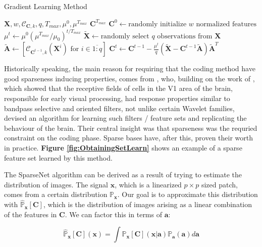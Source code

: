 \documentclass[12pt,a4paper,oneside,english]{UPBThesis}
\newcommand{\hctimes}[2]{{#1}\!\times\!{#2}}
\newcommand{\hcrange}[2]{\overline{{#1}\colon\!\!{#2}}}
\begin{document}
\begin{algorithm}
\caption{Gradient Learning Method}
\label{algo:GradSt}
\begin{algorithmic}
\Require $\textbf{X},w,\mathcal{C}_{\textbf{C},k},q,T_{max},\mu^0,\mu^{T_{max}}$
\Ensure $\textbf{C}^{T_{max}}$
\State $\textbf{C}^0 \gets \mbox{randomly initialize $w$ normalized features}$
\For {$t = \hcrange{1}{T_{max}}$}
\State $\mu^t \gets \mu^0(\mu^{T_{max}} / \mu_0)^{t / T_{max}}$ 
\State $\tilde{\textbf{X}} \gets \mbox{randomly select $q$ observations from $\textbf{X}$}$
\State $\tilde{\textbf{A}} \gets \left[ \mathcal{C}_{\textbf{C}^{t-1},k}(\textbf{X}^i) \mbox{~for $i \in \hcrange{1}{q}$} \right]$
\State $\textbf{C}^t \gets \textbf{C}^{t-1} - \frac{\mu^t}{q} \left( \tilde{\textbf{X}} - \textbf{C}^{t-1}\tilde{\textbf{A}} \right) \tilde{\textbf{A}}^T$
\EndFor
\end{algorithmic}
\end{algorithm}

Historically speaking, the main reason for requiring that the coding method have good sparseness inducing properties, comes from \cite{emergence-sparse-coding,sparse-coding-strategy-V1}, who, building on the work of \cite{macaque-cortex}, which showed that the receptive fields of cells in the V1 area of the brain, responsible for early visual processing, had response properties similar to bandpass selective and oriented filters, not unlike certain Wavelet families, devised an algorithm for learning such filters / feature sets and replicating the behaviour of the brain. Their central insight was that sparseness was the requried constraint on the coding phase. Sparse bases have, after this, proven their worth in practice. \textbf{Figure \ref{fig:ObtainingSetLearn}} shows an example of a sparse feature set learned by this method.

The SparseNet algorithm can be derived as a result of trying to estimate the distribution of images. The signal $\textbf{x}$, which is a linearized $\hctimes{p}{p}$ sized patch, comes from a certain distribution $\mathbb{P}_\textbf{x}$. Our goal is to approximate this distribution with $\hat{\mathbb{P}}_\textbf{x}[\textbf{C}]$, which is the distribution of images arising as a linear combination of the features in $\textbf{C}$. We can factor this in terms of $\textbf{a}$:

\begin{equation*}
\hat{\mathbb{P}}_\textbf{x}[\textbf{C}](\textbf{x}) = \int{ \mathbb{P}_\textbf{x}[\textbf{C}](\textbf{x}\left|\right.\textbf{a}) \mathbb{P}_\textbf{a}(\textbf{a}) d\textbf{a}}
\end{equation*}
\end{document}
